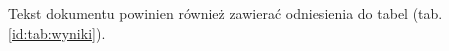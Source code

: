 \documentclass[a4paper,twoside,12pt]{book}
\begin{document}
%
%
%
%
%        


Tekst dokumentu powinien również zawierać odniesienia do tabel (tab. \ref{id:tab:wyniki}).
\end{document}
